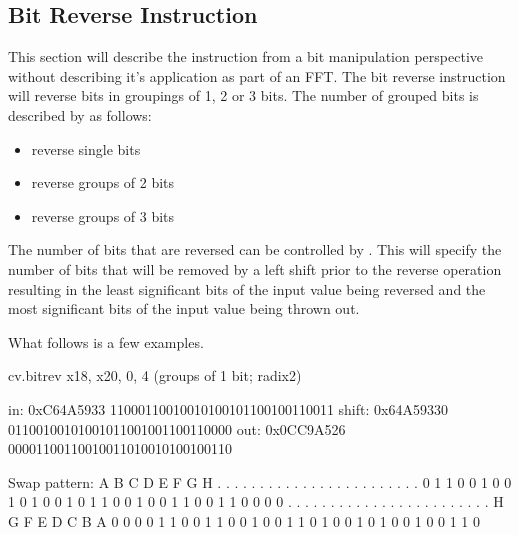 \documentclass[letterpaper,10pt,english]{sphinxmanual}
\begin{document}
\subsection{Bit Reverse Instruction}
\label{\detokenize{instruction_set_extensions:bit-reverse-instruction}}
\sphinxAtStartPar
This section will describe the  instruction from a bit manipulation
perspective without describing it’s application as part of an FFT. The bit
reverse instruction will reverse bits in groupings of 1, 2 or 3 bits. The
number of grouped bits is described by  as follows:
\begin{itemize}
\item {} 
\sphinxAtStartPar
{} \sphinxhyphen{} reverse single bits

\item {} 
\sphinxAtStartPar
{} \sphinxhyphen{} reverse groups of 2 bits

\item {} 
\sphinxAtStartPar
{} \sphinxhyphen{} reverse groups of 3 bits

\end{itemize}

\sphinxAtStartPar
The number of bits that are reversed can be controlled by . This will
specify the number of bits that will be removed by a left shift prior to
the reverse operation resulting in the  least significant bits of
the input value being reversed and the  most significant bits of the
input value being thrown out.

\sphinxAtStartPar
What follows is a few examples.

\begin{sphinxVerbatim}[commandchars=\\\{\}]
cv.bitrev x18, x20, 0, 4 (groups of 1 bit; radix\PYGZhy{}2)

in:    0xC64A5933 11000110010010100101100100110011
shift: 0x64A59330 01100100101001011001001100110000
out:   0x0CC9A526 00001100110010011010010100100110

Swap pattern:
A B C D E F G H . . . . . . . . . . . . . . . . . . . . . . . .
0 1 1 0 0 1 0 0 1 0 1 0 0 1 0 1 1 0 0 1 0 0 1 1 0 0 1 1 0 0 0 0
. . . . . . . . . . . . . . . . . . . . . . . . H G F E D C B A
0 0 0 0 1 1 0 0 1 1 0 0 1 0 0 1 1 0 1 0 0 1 0 1 0 0 1 0 0 1 1 0
\end{sphinxVerbatim}
\end{document}
